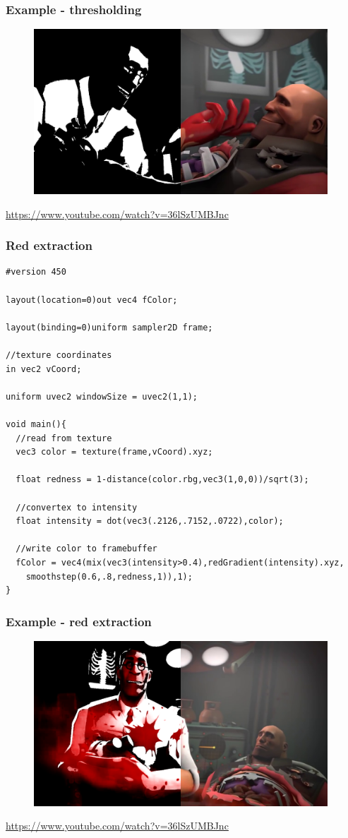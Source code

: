 \begin{frame}
\frametitle{Example - thresholding}
  \begin{figure}[h]
  \includegraphics[width=11cm,keepaspectratio]{pics/rgb_thresholding.png}
  \end{figure}
  \url{https://www.youtube.com/watch?v=36lSzUMBJnc}
\end{frame}



\begin{frame}[fragile]
\frametitle{Red extraction}
  {\scriptsize
  \begin{verbatim}
#version 450

layout(location=0)out vec4 fColor;

layout(binding=0)uniform sampler2D frame;

//texture coordinates
in vec2 vCoord;

uniform uvec2 windowSize = uvec2(1,1);

void main(){
  //read from texture
  vec3 color = texture(frame,vCoord).xyz;

  float redness = 1-distance(color.rbg,vec3(1,0,0))/sqrt(3);

  //convertex to intensity
  float intensity = dot(vec3(.2126,.7152,.0722),color);

  //write color to framebuffer
  fColor = vec4(mix(vec3(intensity>0.4),redGradient(intensity).xyz,
    smoothstep(0.6,.8,redness,1)),1);
}
  \end{verbatim}
  }
\end{frame}

\begin{frame}
\frametitle{Example - red extraction}
  \begin{figure}[h]
  \includegraphics[width=11cm,keepaspectratio]{pics/red_extraction.png}
  \end{figure}
  \url{https://www.youtube.com/watch?v=36lSzUMBJnc}
\end{frame}




